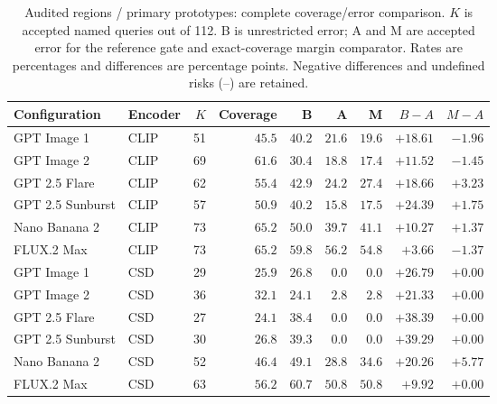 \begin{table}[!htbp]
\caption{Audited regions / primary prototypes: complete coverage/error comparison. $K$ is accepted named queries out of 112. B is unrestricted error; A and M are accepted error for the reference gate and exact-coverage margin comparator. Rates are percentages and differences are percentage points. Negative differences and undefined risks (--) are retained.}
\label{tab:selective-risks-audited-region-primary}
\centering\footnotesize\setlength{\tabcolsep}{3pt}
\begin{tabularx}{\linewidth}{@{}Xlrrrrrrr@{}}\toprule
Configuration & Encoder & $K$ & Coverage & B & A & M & $B-A$ & $M-A$\\\midrule
GPT Image 1 & CLIP & 51 & $45.5$ & $40.2$ & $21.6$ & $19.6$ & $+18.61$ & $-1.96$\\
GPT Image 2 & CLIP & 69 & $61.6$ & $30.4$ & $18.8$ & $17.4$ & $+11.52$ & $-1.45$\\
GPT 2.5 Flare & CLIP & 62 & $55.4$ & $42.9$ & $24.2$ & $27.4$ & $+18.66$ & $+3.23$\\
GPT 2.5 Sunburst & CLIP & 57 & $50.9$ & $40.2$ & $15.8$ & $17.5$ & $+24.39$ & $+1.75$\\
Nano Banana 2 & CLIP & 73 & $65.2$ & $50.0$ & $39.7$ & $41.1$ & $+10.27$ & $+1.37$\\
FLUX.2 Max & CLIP & 73 & $65.2$ & $59.8$ & $56.2$ & $54.8$ & $+3.66$ & $-1.37$\\
GPT Image 1 & CSD & 29 & $25.9$ & $26.8$ & $0.0$ & $0.0$ & $+26.79$ & $+0.00$\\
GPT Image 2 & CSD & 36 & $32.1$ & $24.1$ & $2.8$ & $2.8$ & $+21.33$ & $+0.00$\\
GPT 2.5 Flare & CSD & 27 & $24.1$ & $38.4$ & $0.0$ & $0.0$ & $+38.39$ & $+0.00$\\
GPT 2.5 Sunburst & CSD & 30 & $26.8$ & $39.3$ & $0.0$ & $0.0$ & $+39.29$ & $+0.00$\\
Nano Banana 2 & CSD & 52 & $46.4$ & $49.1$ & $28.8$ & $34.6$ & $+20.26$ & $+5.77$\\
FLUX.2 Max & CSD & 63 & $56.2$ & $60.7$ & $50.8$ & $50.8$ & $+9.92$ & $+0.00$\\
\bottomrule\end{tabularx}
\end{table}
